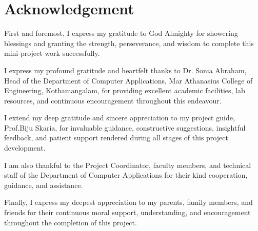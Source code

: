 \documentclass[12pt,a4paper]{report}
\renewcommand{\headrulewidth}{0.4pt}
\renewcommand{\footrulewidth}{0.4pt}
\renewcommand{\headrulewidth}{0.4pt}
\renewcommand{\footrulewidth}{0.4pt}
\begin{document}
\onehalfspacing


\newpage
{}
\setcounter{page}{1}


\pagestyle{fancy}
\fancyhf{}
\fancyfoot[C]{\thepage}

\renewcommand{\headrulewidth}{0pt}
\renewcommand{\footrulewidth}{0pt}

\fancypagestyle{plain}{
    \fancyhf{}
    \fancyfoot[C]{\thepage}
    \renewcommand{\headrulewidth}{0pt}
    \renewcommand{\footrulewidth}{0pt}
}


\chapter*{Acknowledgement}
{}

First and foremost, I express my gratitude to God Almighty
for showering blessings and granting the strength,
perseverance, and wisdom to complete this mini-project
work successfully.

I express my profound gratitude and heartfelt thanks to
Dr. Sonia Abraham, Head of the Department of Computer
Applications, Mar Athanasius College of Engineering,
Kothamangalam, for providing excellent academic facilities,
lab resources, and continuous encouragement throughout
this endeavour.

I extend my deep gratitude and sincere appreciation to
my project guide, Prof.Biju Skaria, for invaluable
guidance, constructive suggestions, insightful feedback,
and patient support rendered during all stages of
this project development.

I am also thankful to the Project Coordinator,
faculty members, and technical staff of the
Department of Computer Applications for their
kind cooperation, guidance, and assistance.

Finally, I express my deepest appreciation to my
parents, family members, and friends for their
continuous moral support, understanding, and
encouragement throughout the completion of
this project.

\vspace{1.5cm}
\end{document}
